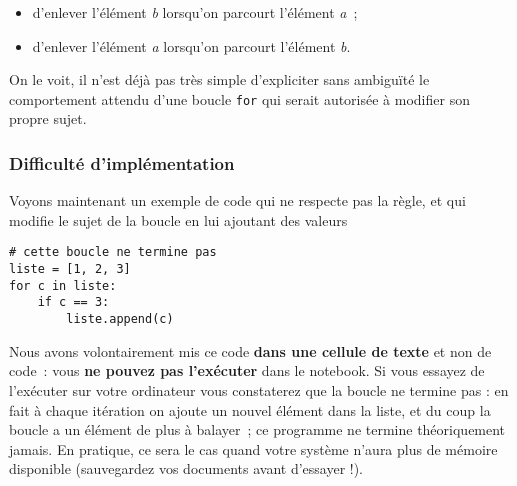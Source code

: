 \begin{itemize}
	\item 
	d'enlever l'élément \emph{b} lorsqu'on parcourt l'élément
	\emph{a}~;
	\item
	d'enlever l'élément \emph{a} lorsqu'on parcourt l'élément
	\emph{b}.
\end{itemize}

On le voit, il n'est déjà pas très simple d'expliciter sans ambiguïté le
comportement attendu d'une boucle \texttt{for} qui serait autorisée à
modifier son propre sujet.

    \hypertarget{difficultuxe9-dimpluxe9mentation}{%
\subsubsection{Difficulté
d'implémentation}\label{difficultuxe9-dimpluxe9mentation}}

    Voyons maintenant un exemple de code qui ne respecte pas la règle, et
qui modifie le sujet de la boucle en lui ajoutant des valeurs

    \begin{verbatim}
# cette boucle ne termine pas
liste = [1, 2, 3]
for c in liste:
    if c == 3:
        liste.append(c)
\end{verbatim}

    Nous avons volontairement mis ce code \textbf{dans une cellule de texte}
et non de code~: vous \textbf{ne pouvez pas l'exécuter} dans le
notebook. Si vous essayez de l'exécuter sur votre ordinateur vous
constaterez que la boucle ne termine pas : en fait à chaque itération on
ajoute un nouvel élément dans la liste, et du coup la boucle a un
élément de plus à balayer~; ce programme ne termine théoriquement
jamais. En pratique, ce sera le cas quand votre système n'aura plus de
mémoire disponible (sauvegardez vos documents avant d'essayer !).